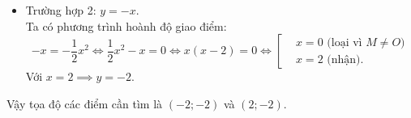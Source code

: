 \begin{bt}
{\begin{enumerate}[a)]
\begin{itemize}
        $$x = -\dfrac{1}{2}x^2 \iff \dfrac{1}{2}x^2 + x = 0 \iff x(x + 2) = 0 \iff \left[\begin{aligned} &x = 0\text{ (loại vì } M \ne O\text{)} \\ &x = -2\text{ (nhận)}. \end{aligned}\right.$$
        Với $x = -2 \implies y = -2$.
        \item Trường hợp 2: $y = -x$.\\
        Ta có phương trình hoành độ giao điểm:
        $$-x = -\dfrac{1}{2}x^2 \iff \dfrac{1}{2}x^2 - x = 0 \iff x(x - 2) = 0 \iff \left[\begin{aligned} &x = 0\text{ (loại vì } M \ne O\text{)} \\ &x = 2\text{ (nhận)}. \end{aligned}\right.$$
        Với $x = 2 \implies y = -2$.
    \end{itemize}
    Vậy tọa độ các điểm cần tìm là $(-2;-2)$ và $(2;-2)$.
\end{enumerate}
}
\end{bt}

